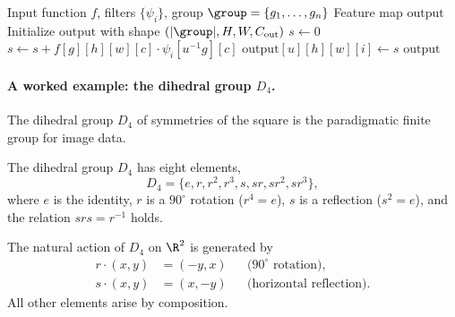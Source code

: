 \begin{algorithm}[h]
\caption{Group convolution layer for a finite group}
\label{alg:groups:gconv-finite}
\begin{algorithmic}[1]
\Require Input function $f$, filters $\{\psi_i\}$, group
  $\group = \{g_1, \dots, g_n\}$
\Ensure Feature map $\mathrm{output}$
\State Initialize $\mathrm{output}$ with shape $(|\group|, H, W, C_{\text{out}})$
      \State $s \leftarrow 0$
          \State $s \leftarrow s + f[g][h][w][c] \cdot \psi_i[u^{-1} g][c]$
        \EndFor
      \EndFor
      \State $\mathrm{output}[u][h][w][i] \leftarrow s$
    \EndFor
  \EndFor
\EndFor
\State \Return $\mathrm{output}$
\end{algorithmic}
\end{algorithm}

\paragraph{A worked example: the dihedral group $D_4$.}
The dihedral group $D_4$ of symmetries of the square is the paradigmatic finite
group for image data.

\begin{definition}
\label{def:groups:d4}
The dihedral group $D_4$ has eight elements,
\begin{equation}
  D_4 = \{e, r, r^2, r^3, s, sr, sr^2, sr^3\},
\end{equation}
where $e$ is the identity, $r$ is a $90^\circ$ rotation ($r^4 = e$), $s$ is a
reflection ($s^2 = e$), and the relation $s r s = r^{-1}$ holds.
\end{definition}

\begin{proposition}
\label{prop:groups:d4-action}
The natural action of $D_4$ on $\R^2$ is generated by
\begin{align}
  r \cdot (x,y) &= (-y, x) && \text{($90^\circ$ rotation),} \\
  s \cdot (x,y) &= (x, -y) && \text{(horizontal reflection).}
\end{align}
All other elements arise by composition.
\end{proposition}

